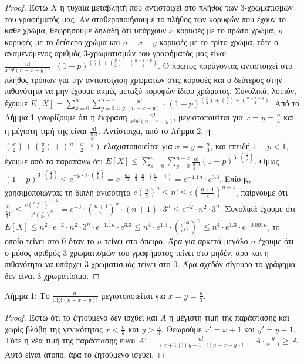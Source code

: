 \documentclass[a4paper, oneside, 11pt]{article}
\theoremstyle{definition}
\begin{document}
\begin{enumerate}
   \begin{proof}
Έστω $X$ η τυχαία μεταβλητή που αντιστοιχεί στο πλήθος των 3-χρωματισμών του γραφήματός μας. Αν σταθεροποιήσουμε το πλήθος των κορυφών που έχουν το κάθε χρώμα, θεωρήσουμε δηλαδή ότι υπάρχουν $x$ κορυφές
με το πρώτο χρώμα, $y$ κορυφές με το δεύτερο χρώμα και $n-x-y$ κορυφές με το τρίτο χρώμα, τότε ο αναμενόμενος αριθμός 3-χρωματισμών του γραφήματός μας είναι $\frac{n!}{x!y!(n-x-y)!} \cdot 
(1-p)^{{x \choose 2} + {y\choose 2} + {n-x-y\choose 2}}$. Ο πρώτος παράγοντας αντιστοιχεί στο πλήθος τρόπων για την αντιστοίχιση χρωμάτων στις κορυφές και ο δεύτερος στην πιθανότητα να μην έχουμε ακμές
μεταξύ κορυφών ίδιου χρώματος. Συνολικά, λοιπόν, έχουμε $E[X] = \sum_{x=0}^{n} \sum_{y=0}^{n-x} \frac{n!}{x!y!(n-x-y)!}\cdot (1-p)^{{x\choose 2}+{y\choose 2}+{n-x-y\choose 2}}$. Από το Λήμμα 1 γνωρίζουμε ότι η έκφραση $\frac{n!}{x!y!(n-x-y)!}$ μεγιστοποιείται για $x=y=\frac{n}{3}$ και η μέγιστη τιμή της είναι $\frac{n!}{\frac{n}{3}!^3}$. Αντίστοιχα, 
από το Λήμμα 2,
η ${{x \choose 2} + {y\choose 2} + {n-x-y\choose 2}}$ 
ελαχιστοποιείται για $x=y=\frac{n}{3}$, και επειδή $1-p<1$, έχουμε από τα παραπάνω ότι $E[X] \leq \sum_{x=0}^{n}\sum_{y=0}^{n-x} \frac{n!}{\frac{n}{3}!^3} (1-p)^{3\cdot {\frac{n}{3}\choose 2}}$.
Όμως $(1-p)^{3\cdot {\frac{n}{3}\choose 2}}\leq e^{-p\cdot {3\cdot {\frac{n}{3}\choose 2}}}=e^{-\frac{6.6}{n}\cdot {\frac{3}{2}\cdot \frac{n}{3}\cdot (\frac{n}{3}-1)}}=e^{-1.1n}\cdot e^{3.3}$.
Επίσης, χρησιμοποιώντας τη διπλή ανισότητα $e(\frac{n}{e})^n \leq n! \leq e(\frac{n+1}{e})^{n+1}$, παίρνουμε ότι $\frac{n!}{\frac{n}{3}!^3}\leq \frac{e(\frac{n+1}{e})^{n+1}}{e^3 (\frac{n}{3e})^n
}=e^{-3} \cdot (\frac{n+1}{n})^n \cdot (n+1) \cdot 3^{n} \leq e^{-2} \cdot n^2 \cdot 3^{n}$. Συνολικά έχουμε ότι $E[X] \leq n^2 \cdot e^{-2} \cdot n^2 \cdot 3^{n}\cdot e^{-1.1n}\cdot e^{3.3}\leq 
n^4 \cdot e^{1.3}\cdot (\frac{e^{ln3}}{e^{1.1}})^n \leq n^4\cdot e^{1.3}\cdot e^{-0.001n}$, το οποίο τείνει στο 0 όταν το $n$ τείνει στο άπειρο. Άρα για αρκετά μεγάλο $n$ έχουμε ότι ο μέσος αριθμός
3-χρωματισμών του γραφήματος τείνει στο μηδέν, άρα και η πιθανότητα να υπάρχει 3-χρωματισμός τείνει στο 0. Άρα σχεδόν σίγουρα το γράφημα δεν είναι 3-χρωματίσιμο.
   \end{proof}

Λήμμα 1: Το $\frac{n!}{x!y!(n-x-y)!}$ μεγιστοποιείται για $x=y=\frac{n}{3}$.
\begin{proof}
Έστω ότι το ζητούμενο δεν ισχύει και $A$ η μέγιστη τιμή της παράστασης και χωρίς βλάβη της γενικότητας $x<\frac{n}{3}$ και $y>\frac{n}{3}$. Θεωρούμε $x'=x+1$ και $y'=y-1$. Τότε η νέα τιμή της παράστασης
είναι $A'=\frac{n!}{(x+1)!(y-1)!(n-x-y)!} = A \cdot \frac{y}{x+1}\geq A$. Αυτό είναι άτοπο, άρα το ζητούμενο ισχύει.
\end{proof}


\end{enumerate}
\end{document}
